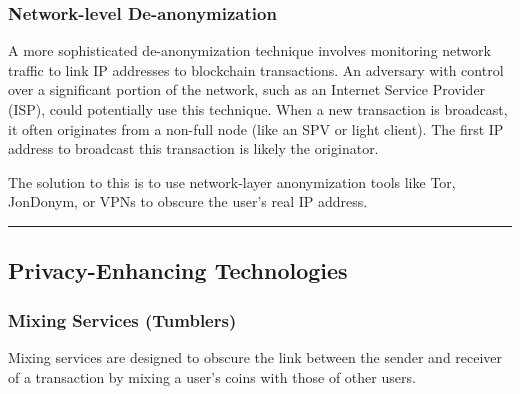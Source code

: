 
\subsubsection{Network-level
De-anonymization}\label{network-level-de-anonymization}

A more sophisticated de-anonymization technique involves monitoring
network traffic to link IP addresses to blockchain transactions. An
adversary with control over a significant portion of the network, such
as an Internet Service Provider (ISP), could potentially use this
technique. When a new transaction is broadcast, it often originates from
a non-full node (like an SPV or light client). The first IP address to
broadcast this transaction is likely the originator.

The solution to this is to use network-layer anonymization tools like
Tor, JonDonym, or VPNs to obscure the user's real IP address.


\begin{center}\rule{0.5\linewidth}{0.5pt}\end{center}

\subsection{Privacy-Enhancing
Technologies}\label{section-3-privacy-enhancing-technologies}

\subsubsection{Mixing Services
(Tumblers)}\label{mixing-services-tumblers}

Mixing services are designed to obscure the link between the sender and
receiver of a transaction by mixing a user's coins with those of other
users.


